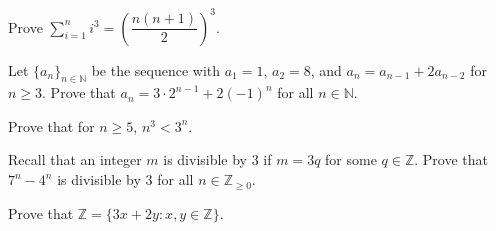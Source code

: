 \documentclass[11pt,letterpaper]{article}
\begin{document}
\homework{}

 Prove $\displaystyle \sum_{i=1}^n i^3= \left( \dfrac{n(n + 1)}{2} \right)^3$. 





\newpage





 Let $\{ a_n \}_{n \in \mathbb{N}}$ be the sequence with $a_1= 1$, $a_2= 8$, and $a_n= a_{n-1} + 2a_{n-2}$ for $n \geq 3$. Prove that $a_n= 3 \cdot 2^{n-1} + 2(-1)^n$ for all $n \in \mathbb{N}$. 





\newpage





 Prove that for $n \geq 5$, $n^3 < 3^n$. 





\newpage





 Recall that an integer $m$ is divisible by 3 if $m= 3q$ for some $q \in \mathbb{Z}$. Prove that $7^n - 4^n$ is divisible by 3 for all $n \in \mathbb{Z}_{\geq 0}$. 





\newpage





 Prove that $\mathbb{Z}= \{ 3x + 2y \colon x, y \in \mathbb{Z} \}$. 
\end{document}
